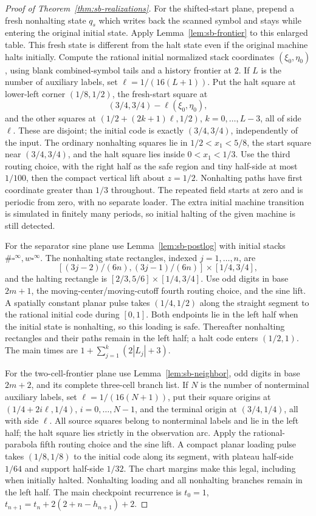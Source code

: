 \begin{proof}[Proof of Theorem~\ref{thm:sb-realizations}]
For the shifted-start plane, prepend a fresh nonhalting state $q_s$ which writes back the scanned symbol and stays while entering the original initial state.  Apply Lemma~\ref{lem:sb-frontier} to this enlarged table.  This fresh state is different from the halt state even if the original machine halts initially.  Compute the rational initial normalized stack coordinates $(\xi_0,\eta_0)$, using blank combined-symbol tails and a history frontier at $2$.  If $L$ is the number of auxiliary labels, set $\ell=1/(16(L+1))$.  Put the halt square at lower-left corner $(1/8,1/2)$, the fresh-start square at
\[
 (3/4,3/4)-\ell(\xi_0,\eta_0),
\]
and the other squares at $(1/2+(2k+1)\ell,1/2)$, $k=0,\ldots,L-3$, all of side $\ell$.  These are disjoint; the initial code is exactly $(3/4,3/4)$, independently of the input.  The ordinary nonhalting squares lie in $1/2<x_1<5/8$, the start square near $(3/4,3/4)$, and the halt square lies inside $0<x_1<1/3$.  Use the third routing choice, with the right half as the safe region and tiny half-side at most $1/100$, then the compact vertical lift about $z=1/2$.  Nonhalting paths have first coordinate greater than $1/3$ throughout.  The repeated field starts at zero and is periodic from zero, with no separate loader.  The extra initial machine transition is simulated in finitely many periods, so initial halting of the given machine is still detected.

For the separator sine plane use Lemma~\ref{lem:sb-postlog} with initial stacks $\#\square^\infty,w\square^\infty$.  The nonhalting state rectangles, indexed $j=1,\ldots,n$, are
\[
 [(3j-2)/(6n),(3j-1)/(6n)]\times[1/4,3/4],
\]
and the halting rectangle is $[2/3,5/6]\times[1/4,3/4]$.  Use odd digits in base $2m+1$, the moving-center/moving-cutoff fourth routing choice, and the sine lift.  A spatially constant planar pulse takes $(1/4,1/2)$ along the straight segment to the rational initial code during $[0,1]$.  Both endpoints lie in the left half when the initial state is nonhalting, so this loading is safe.  Thereafter nonhalting rectangles and their paths remain in the left half; a halt code enters $(1/2,1)$.  The main times are $1+\sum_{j=1}^k(2|L_j|+3)$.

For the two-cell-frontier plane use Lemma~\ref{lem:sb-neighbor}, odd digits in base $2m+2$, and its complete three-cell branch list.  If $N$ is the number of nonterminal auxiliary labels, set $\ell=1/(16(N+1))$, put their square origins at $(1/4+2i\ell,1/4)$, $i=0,\ldots,N-1$, and the terminal origin at $(3/4,1/4)$, all with side $\ell$.  All source squares belong to nonterminal labels and lie in the left half; the halt square lies strictly in the observation arc.  Apply the rational-parabola fifth routing choice and the sine lift.  A compact planar loading pulse takes $(1/8,1/8)$ to the initial code along its segment, with plateau half-side $1/64$ and support half-side $1/32$.  The chart margins make this legal, including when initially halted.  Nonhalting loading and all nonhalting branches remain in the left half.  The main checkpoint recurrence is
$t_0=1$, $t_{n+1}=t_n+2(2+n-h_{n+1})+2$.


\end{proof}
